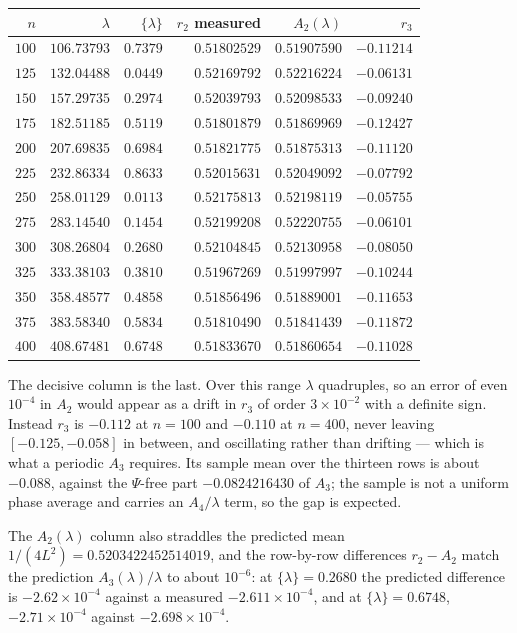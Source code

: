 \documentclass[11pt,oneside]{article}
\theoremstyle{definition}
\theoremstyle{remark}
\begin{document}
\begin{center}\small
\begin{tabular}{@{}rrrrrr@{}}
\toprule
$n$ & $\lambda$ & $\{\lambda\}$ & $r_2$ measured & $A_2(\lambda)$ & $r_3$\\
\midrule
$100$ & $106.73793$ & $0.7379$ & $0.51802529$ & $0.51907590$ & $-0.11214$\\
$125$ & $132.04488$ & $0.0449$ & $0.52169792$ & $0.52216224$ & $-0.06131$\\
$150$ & $157.29735$ & $0.2974$ & $0.52039793$ & $0.52098533$ & $-0.09240$\\
$175$ & $182.51185$ & $0.5119$ & $0.51801879$ & $0.51869969$ & $-0.12427$\\
$200$ & $207.69835$ & $0.6984$ & $0.51821775$ & $0.51875313$ & $-0.11120$\\
$225$ & $232.86334$ & $0.8633$ & $0.52015631$ & $0.52049092$ & $-0.07792$\\
$250$ & $258.01129$ & $0.0113$ & $0.52175813$ & $0.52198119$ & $-0.05755$\\
$275$ & $283.14540$ & $0.1454$ & $0.52199208$ & $0.52220755$ & $-0.06101$\\
$300$ & $308.26804$ & $0.2680$ & $0.52104845$ & $0.52130958$ & $-0.08050$\\
$325$ & $333.38103$ & $0.3810$ & $0.51967269$ & $0.51997997$ & $-0.10244$\\
$350$ & $358.48577$ & $0.4858$ & $0.51856496$ & $0.51889001$ & $-0.11653$\\
$375$ & $383.58340$ & $0.5834$ & $0.51810490$ & $0.51841439$ & $-0.11872$\\
$400$ & $408.67481$ & $0.6748$ & $0.51833670$ & $0.51860654$ & $-0.11028$\\
\bottomrule
\end{tabular}
\end{center}

The decisive column is the last.  Over this range $\lambda$ quadruples, so
an error of even $10^{-4}$ in $A_2$ would appear as a drift in $r_3$ of
order $3\times10^{-2}$ with a definite sign.  Instead $r_3$ is $-0.112$ at
$n=100$ and $-0.110$ at $n=400$, never leaving $[-0.125,-0.058]$ in
between, and oscillating rather than drifting --- which is what a periodic
$A_3$ requires.  Its sample mean over the thirteen rows is about $-0.088$,
against the $\Psi$-free part $-0.0824216430$ of $A_3$; the sample is not a
uniform phase average and carries an $A_4/\lambda$ term, so the gap is
expected.

The $A_2(\lambda)$ column also straddles the predicted mean
$1/(4L^2)=0.5203422452514019$, and the row-by-row differences
$r_2-A_2$ match the prediction $A_3(\lambda)/\lambda$ to about $10^{-6}$:
at $\{\lambda\}=0.2680$ the predicted difference is $-2.62\times10^{-4}$
against a measured $-2.611\times10^{-4}$, and at $\{\lambda\}=0.6748$,
$-2.71\times10^{-4}$ against $-2.698\times10^{-4}$.
\end{document}
